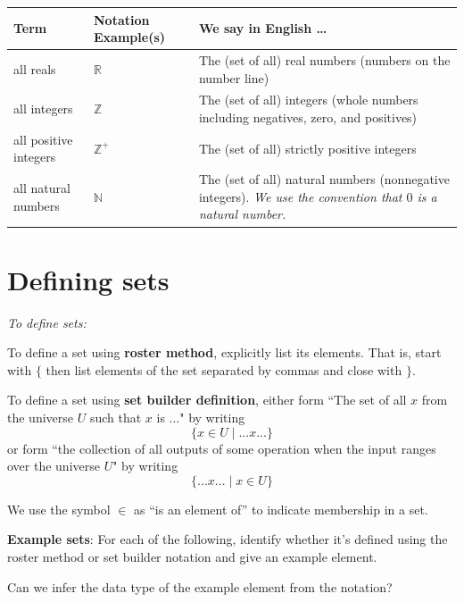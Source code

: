 \documentclass[12pt, oneside]{article}
\begin{document}
\begin{center}
\begin{tabular}{|llp{9.8cm}|}
\hline
{\bf Term} & {\bf Notation Example(s)} & {\bf We say in English \ldots } \\
\hline
all reals & $\mathbb{R}$ & The (set of all) real numbers (numbers on the number line)\\
all integers & $\mathbb{Z}$ & The (set of all) integers (whole numbers including negatives, zero, and positives) \\
all positive integers & $\mathbb{Z}^+$ & The (set of all) strictly positive integers \\
all natural numbers & $\mathbb{N}$ & The (set of all) natural numbers (nonnegative integers). {\it We use the convention that $0$ is a natural number.} \\


\hline
\end{tabular}
\end{center} \vfill
\section*{Defining sets}


{\it To define sets:}

To define a set using {\bf roster method}, explicitly list its elements. That is,
start with $\{$ then list elements of 
the set separated by commas and close with $\}$.

\vfill

To define a set using {\bf set builder definition}, either form 
``The set of all $x$ from the universe $U$ such that $x$ is ..." by writing
\[\{x \in U \mid ...x... \}\]
or form ``the collection of all outputs of some operation when the input ranges over the universe $U$"
by writing
\[\{ ...x... \mid x\in U \}\]

\vfill

We use the symbol $\in$ as ``is an element of'' to indicate membership in a set.\\

\newpage 

{\bf Example sets}: For each of the following, identify whether it's defined using the roster method
or set builder notation and give an example element.

Can we infer the data type of the example element from the notation?
\end{document}
